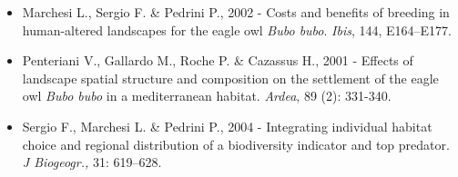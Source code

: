 \begin{itemize}
	\item Marchesi L., Sergio F. \& Pedrini P., 2002 - Costs and benefits of
breeding in human-altered landscapes for the eagle owl \textit{Bubo
bubo}. \textit{Ibis}, 144, E164--E177.

	\item Penteriani V., Gallardo M., Roche P. \& Cazassus H., 2001 - Effects of
landscape spatial structure and composition on the settlement of the
eagle owl \textit{Bubo bubo }in a mediterranean habitat.
\textit{Ardea}, 89 (2): 331-340.

	\item Sergio F., Marchesi L. \& Pedrini P., 2004 - Integrating individual
habitat choice and regional distribution of a biodiversity indicator
and top predator. \textit{J Biogeogr.,} 31: 619--628.
\end{itemize}
